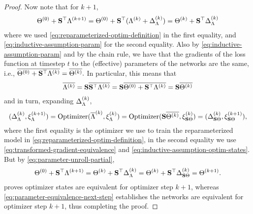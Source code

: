 \begin{proof}
Now note that for $k+1$,
\begin{align}
\Theta^{(0)} + {\mathbf{S}}^\top \Lambda^{(k+1)} 
= \Theta^{(0)} + {\mathbf{S}}^\top (\Lambda^{(k)} + \Delta_{\Lambda}^{(k)})  =  \Theta^{(k)} + {\mathbf{S}}^\top \Delta_{\Lambda}^{(k)} 
\label{eq:parameter-unroll-partial}
\end{align}
where we used \cref{eq:reparameterized-optim-definition} in the first equality, and \cref{eq:inductive-assumption-param} for the second equality.
Also by \cref{eq:inductive-assumption-param} and by the chain rule, we have that the gradients of the loss function at timestep $t$ to the (effective) parameters of the networks are the same, i.e.,
$
    \overline{\Theta^{(0)} + {\mathbf{S}}^\top \Lambda^{(k)}} = \overline{\Theta^{(k)}}.
$
In particular, this means that
\begin{align}
\overline{\Lambda^{(k)}} = {\mathbf{S}} \overline{{\mathbf{S}}^\top \Lambda^{(k)}} 
= {\mathbf{S}} \overline{\Theta^{(0)} + {\mathbf{S}}^\top \Lambda^{(k)}} 
= {\mathbf{S}} \overline{\Theta^{(k)}}
\label{eq:transformed-gradient-equivalence}
\end{align}
and in turn, expanding $\Delta_{\Lambda}^{(k)}$,
\begin{align}
   (\Delta_{\Lambda}^{(k)}, \xi_{\Lambda}^{(k + 1)}) = \operatorname{Optimizer}( \overline{\Lambda}^{(k)}, \xi_{\Lambda}^{(k)})  
   = \operatorname{Optimizer}({\mathbf{S}} \overline{\Theta^{(k)}}, \xi_{{\mathbf{S}}\Theta}^{(k)}) 
   = (\Delta_{{\mathbf{S}}\Theta}^{(k)}, \xi_{{\mathbf{S}}\Theta}^{(k + 1)}),
   \label{eq:optimizer-output-equivalence-next-step}
\end{align}
where the first equality is the optimizer we use to train the reparameterized model in \cref{eq:reparameterized-optim-definition},
in the second equality we use \cref{eq:transformed-gradient-equivalence} and \cref{eq:inductive-assumption-optim-states}. But by \cref{eq:parameter-unroll-partial},
\begin{align}
\Theta^{(0)} + {\mathbf{S}}^\top \Lambda^{(k+1)} 
    = \Theta^{(k)} + {\mathbf{S}}^{\top}\Delta^{(k)}_{\Lambda}    = \Theta^{(k)} + {\mathbf{S}}^{\top}\Delta^{(k)}_{{\mathbf{S}}\Theta}  = \Theta^{(k+1)}.
   \label{eq:parameter-equivalence-next-step}
\end{align}
 proves optimizer states are equivalent for optimizer step $k+1$, whereas \cref{eq:parameter-equivalence-next-step} establishes the networks are equivalent for optimizer step $k+1$, thus completing the proof.
\end{proof}


